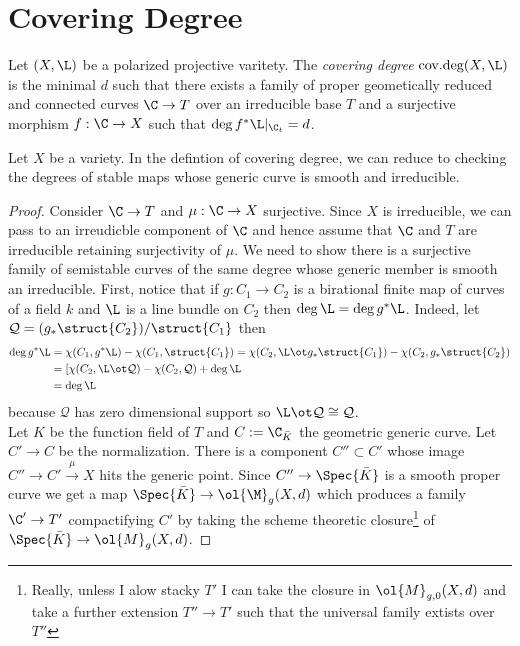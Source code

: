 \documentclass[12pt]{article}
\DeclareMathOperator{\covdeg}{\text{cov.deg}}
\begin{document}
\section{Covering Degree}


\begin{defn}
Let $(X, \L)$ be a polarized projective varitety. The \textit{covering degree} $\covdeg(X, \L)$ is the minimal $d$ such that there exists a family of proper geometically reduced and connected curves $\C \to T$ over an irreducible base $T$ and a surjective morphism $f : \C \to X$ such that $\deg{f^* \L|_{\C_t}} = d$.
\end{defn}

\begin{lemma}
Let $X$ be a variety. In the defintion of covering degree, we can reduce to checking the degrees of stable maps whose generic curve is smooth and irreducible. 
\end{lemma}

\newcommand{\cQ}{\mathcal{Q}}

\begin{proof}
Consider $\C \to T$ and $\mu : \C \to X$ surjective. Since $X$ is irreducible, we can pass to an irreudicble component of $\C$ and hence assume that $\C$ and $T$ are irreducible retaining surjectivity of $\mu$. We need to show there is a surjective family of semistable curves of the same degree whose generic member is smooth an irreducible. First, notice that if $g : C_1 \to C_2$ is a birational finite map of curves of a field $k$ and $\L$ is a line bundle on $C_2$ then $\deg{\L} = \deg{g^* \L}$. Indeed, let $\cQ = (g_* \struct{C_2}) / \struct{C_1}$ then
\begin{align*}
\deg{g^* \L} & = \chi(C_1, g^* \L) - \chi(C_1, \struct{C_1}) = \chi(C_2, \L \ot g_* \struct{C_1}) - \chi(C_2, g_* \struct{C_2})
\\
& = [\chi(C_2, \L \ot \cQ) - \chi(C_2, \cQ) + \deg{\L} 
\\
& = \deg{\L}
\end{align*} 
because $\cQ$ has zero dimensional support so $\L \ot \cQ \cong \cQ$.
\bigskip\\
Let $K$ be the function field of $T$ and $C := \C_{\bar{K}}$ the geometric generic curve. Let $C' \to C$ be the normalization. There is a component $C'' \subset C'$ whose image $C'' \to C' \xrightarrow{\mu} X$ hits the generic point. Since $C'' \to \Spec{\bar{K}}$ is a smooth proper curve we get a map $\Spec{\bar{K}} \to \ol{\M}_g(X, d)$ which produces a family $\C' \to T'$ compactifying $C'$ by taking the scheme theoretic closure\footnote{Really, unless I alow stacky $T'$ I can take the closure in $\ol{M}_{g,0}(X, d)$ and take a further extension $T'' \to T'$ such that the universal family extists over $T''$} of $\Spec{\bar{K}} \to \ol{M}_{g}(X, d)$.
\end{proof}
\end{document}
